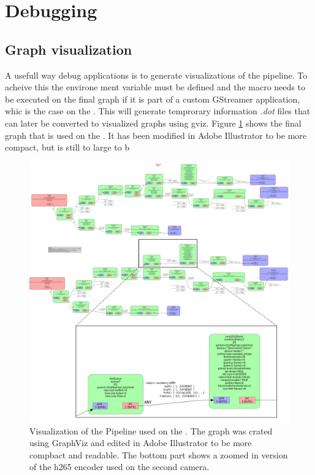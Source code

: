 \section{Debugging}

\subsection{Graph visualization}
A usefull way debug \gs applications is to generate visualizations of the pipeline.
To acheive this the environe ment variable  must be defined and the  macro needs to be executed on the final graph if it is part of a custom GStreamer application, whic is the case on the \sr.
\cite{johnstonGeneratingGStreamerPipeline2018}
This will generate temprorary information \textit{.dot} files that can later be converted to visualized graphs using \gls{gviz}.
Figure \ref{fig:gs_pipeline_visualization} shows the final graph that is used on the \sr.
It has been modified in Adobe Illustrator to be more compact, but is still to large to b


\begin{figure}[H]
    \centering
    \includegraphics[width=\textwidth]{figures/gstreamer/pipeline.pdf}
    \caption{Visualization of the \gs Pipeline used on the \sr.
        The graph was crated using GraphViz and edited in Adobe Illustrator to be more compbact and readable. The bottom part shows a zoomed in version of the \gls{h265} encoder used on the second camera.}
    \label{fig:gs_pipeline_visualization}
\end{figure}

